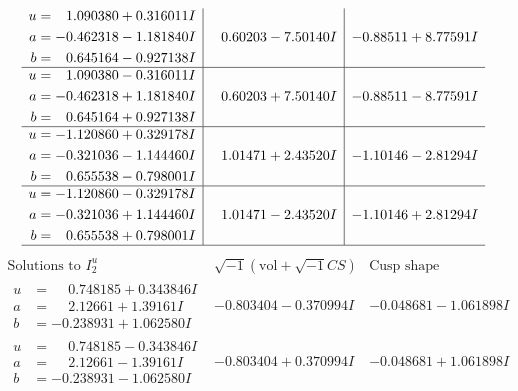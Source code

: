 \documentclass[1p]{elsarticle_modified}
\theoremstyle{definition}
\newcommand{\I}{\sqrt{-1}}
\begin{document}
$$\begin{array}{c|c|c}
\begin{aligned}
u &= \phantom{-}1.090380 + 0.316011 I \\
a &= -0.462318 - 1.181840 I \\
b &= \phantom{-}0.645164 - 0.927138 I\end{aligned}
 & \phantom{-}0.60203 - 7.50140 I & -0.88511 + 8.77591 I \\ \hline\begin{aligned}
u &= \phantom{-}1.090380 - 0.316011 I \\
a &= -0.462318 + 1.181840 I \\
b &= \phantom{-}0.645164 + 0.927138 I\end{aligned}
 & \phantom{-}0.60203 + 7.50140 I & -0.88511 - 8.77591 I \\ \hline\begin{aligned}
u &= -1.120860 + 0.329178 I \\
a &= -0.321036 - 1.144460 I \\
b &= \phantom{-}0.655538 - 0.798001 I\end{aligned}
 & \phantom{-}1.01471 + 2.43520 I & -1.10146 - 2.81294 I \\ \hline\begin{aligned}
u &= -1.120860 - 0.329178 I \\
a &= -0.321036 + 1.144460 I \\
b &= \phantom{-}0.655538 + 0.798001 I\end{aligned}
 & \phantom{-}1.01471 - 2.43520 I & -1.10146 + 2.81294 I\\
 \hline 
 \end{array}$$\newpage$$\begin{array}{c|c|c}  
\text{Solutions to }I^u_{2}& \I (\text{vol} + \sqrt{-1}CS) & \text{Cusp shape}\\
 \hline 
\begin{aligned}
u &= \phantom{-}0.748185 + 0.343846 I \\
a &= \phantom{-}2.12661 + 1.39161 I \\
b &= -0.238931 + 1.062580 I\end{aligned}
 & -0.803404 - 0.370994 I & -0.048681 - 1.061898 I \\ \hline\begin{aligned}
u &= \phantom{-}0.748185 - 0.343846 I \\
a &= \phantom{-}2.12661 - 1.39161 I \\
b &= -0.238931 - 1.062580 I\end{aligned}
 & -0.803404 + 0.370994 I & -0.048681 + 1.061898 I \\ \hline\begin{aligned}

\end{aligned}
\end{array}$$
\end{document}
